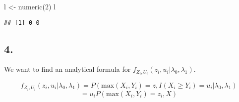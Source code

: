 \documentclass[
]{article}
\newenvironment{Shaded}{\begin{snugshade}}{\end{snugshade}}
\newcommand{\DecValTok}[1]{\textcolor[rgb]{0.00,0.00,0.81}{#1}}
\newcommand{\FunctionTok}[1]{\textcolor[rgb]{0.00,0.00,0.00}{#1}}
\newcommand{\NormalTok}[1]{#1}
\newcommand{\OtherTok}[1]{\textcolor[rgb]{0.56,0.35,0.01}{#1}}
\begin{document}
\begin{Shaded}
\begin{Highlighting}[]
\NormalTok{l }\OtherTok{\textless{}{-}} \FunctionTok{numeric}\NormalTok{(}\DecValTok{2}\NormalTok{)}
\NormalTok{l}
\end{Highlighting}
\end{Shaded}

\begin{verbatim}
## [1] 0 0
\end{verbatim}

\hypertarget{section-1}{%
\subsection{4.}\label{section-1}}

We want to find an analytical formula for \(f_{Z_i,U_i}(z_i, u_i| \lambda_0, \lambda_1).\)

\[
f_{Z_i,U_i}(z_i, u_i | \lambda_0, \lambda_1)=P(\text{max}(X_i, Y_i)=z , I(X_i \geq Y_i)=u_i | \lambda_0, \lambda_1)
\]
\[
=u_i P(\text{max}(X_i, Y_i)=z_i, X)
\]
\end{document}
